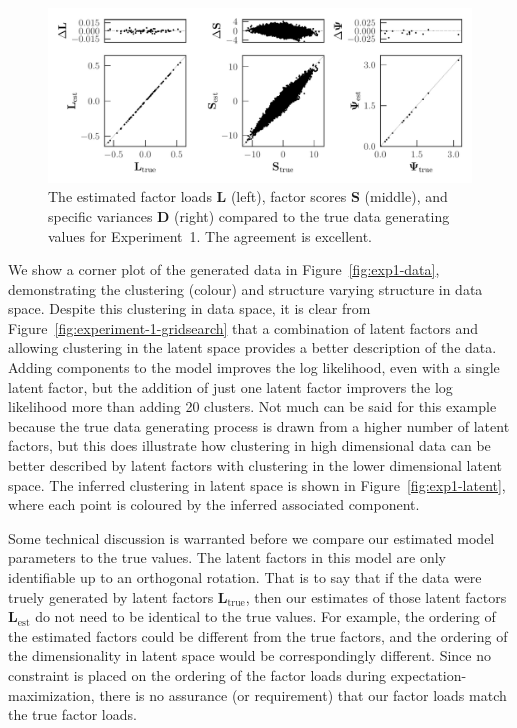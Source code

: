 \documentclass[twocolumn]{aastex62}
\newcommand{\vect}[1]{\boldsymbol{\mathbf{#1}}}
\renewcommand{\vec}[1]{\vect{#1}}
\newcommand{\factorloads}{\textbf{L}}
\newcommand{\factorscores}{\textbf{S}}
\newcommand{\specificvariance}{\vec{D}}
\begin{document}
\begin{figure}
	\includegraphics[width=\textwidth]{experiments/exp1-compare-all.pdf}
    \caption{The estimated factor loads $\factorloads$ (left), factor scores $\factorscores$ (middle),
    		 and specific variances $\specificvariance$ (right) compared to the 
		 	 true data generating values
		 	 for Experiment~1. The agreement is excellent.}
    \label{fig:exp1-compare}
\end{figure}


We show a corner plot of the generated data in Figure~\ref{fig:exp1-data},
demonstrating the clustering (colour) and structure varying structure in data space.
Despite this clustering in data space, it is clear from Figure~\ref{fig:experiment-1-gridsearch} that a combination of latent factors
and allowing clustering in the latent space provides a better description of the data.
Adding components to the model improves the log likelihood, even with a single latent factor,
but the addition of just one latent factor improvers the log likelihood more than adding
20 clusters. Not much can be said for this example because the true data generating process 
is drawn from a higher number of latent factors, but this does illustrate how 
clustering in high dimensional data can be better described by latent factors with 
clustering in the lower dimensional latent space.
The inferred clustering in latent space is shown in Figure~\ref{fig:exp1-latent},
where each point is coloured by the inferred associated component. 





Some technical discussion is warranted before we compare our estimated model
parameters to the true values. The latent factors in this model are only
identifiable up to an orthogonal rotation. That is to say that
if the data were truely generated by latent factors $\factorloads_\textrm{true}$,
then our estimates of those latent factors $\factorloads_\textrm{est}$ do not need
to be identical to the true values. For example, the ordering of the estimated factors
could be different from the true factors, and the ordering of the dimensionality
in latent space would be correspondingly different. Since no constraint is
placed on the ordering of the factor loads during expectation-maximization,
there is no assurance (or requirement) that our factor loads match the true factor loads.
\end{document}
